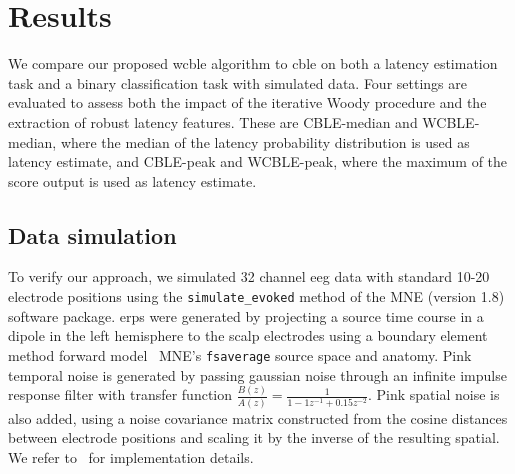 \section{Results}

We compare our proposed \ac{wcble} algorithm to \ac{cble} on both a latency
estimation task and a binary classification task with simulated data.
Four settings are evaluated to assess both the impact of the iterative Woody
procedure and the extraction of robust latency features.
These are CBLE-median and WCBLE-median, where the median of the latency
probability distribution is used as latency estimate, and CBLE-peak and
WCBLE-peak, where the maximum of the score output is used as latency estimate.

\subsection{Data simulation}
To verify our approach, we simulated 32 channel \ac{eeg} data with standard
10-20 electrode positions using the \texttt{simulate\_evoked} method of the
MNE (version 1.8)~\cite{Gramfort2013} software package.
\Acp{erp} were generated by projecting a source time course in a dipole in the
left hemisphere to the scalp electrodes using a boundary element method forward
model~\cite{Mosher1999} MNE's \texttt{fsaverage} source space and anatomy.
Pink temporal noise is generated by passing gaussian noise through an infinite
impulse response filter with transfer function
$\frac{B(z)}{A(z)} = \frac{1}{1 -1z^{-1}+0.15z^{-2}}$.
Pink spatial noise is also added, using a noise covariance matrix constructed from the
cosine distances between electrode positions and scaling it by the inverse of
the resulting spatial.
We refer to~\textcite{Gramfort2014} for implementation details.

